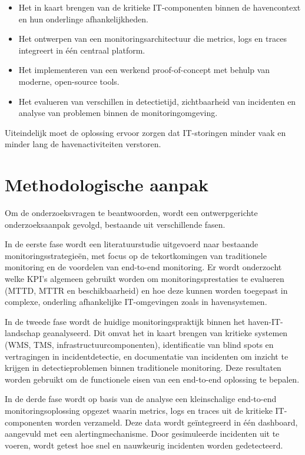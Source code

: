 \begin{itemize}
    \item Het in kaart brengen van de kritieke IT-componenten binnen de havencontext en hun onderlinge afhankelijkheden.
    \item Het ontwerpen van een monitoringsarchitectuur die metrics, logs en traces integreert in één centraal platform.
    \item Het implementeren van een werkend proof-of-concept met behulp van moderne, open-source tools.
    \item Het evalueren van verschillen in detectietijd, zichtbaarheid van incidenten en analyse van problemen binnen de monitoringomgeving.
\end{itemize}

Uiteindelijk moet de oplossing ervoor zorgen dat IT-storingen minder vaak en minder lang de havenactiviteiten verstoren.

\section{Methodologische aanpak}

Om de onderzoeksvragen te beantwoorden, wordt een ontwerpgerichte onderzoeksaanpak gevolgd, bestaande uit verschillende fasen.

In de eerste fase wordt een literatuurstudie uitgevoerd naar bestaande monitoringsstrategieën, met focus op de tekortkomingen van traditionele monitoring en de voordelen van end-to-end monitoring. Er wordt onderzocht welke KPI's algemeen gebruikt worden om monitoringsprestaties te evalueren (MTTD, MTTR en beschikbaarheid) en hoe deze kunnen worden toegepast in complexe, onderling afhankelijke IT-omgevingen zoals in havensystemen.

In de tweede fase wordt de huidige monitoringspraktijk binnen het haven-IT-landschap geanalyseerd. Dit omvat het in kaart brengen van kritieke systemen (WMS, TMS, infrastructuurcomponenten), identificatie van blind spots en vertragingen in incidentdetectie, en documentatie van incidenten om inzicht te krijgen in detectieproblemen binnen traditionele monitoring. Deze resultaten worden gebruikt om de functionele eisen van een end-to-end oplossing te bepalen.

In de derde fase wordt op basis van de analyse een kleinschalige end-to-end monitoringsoplossing opgezet waarin metrics, logs en traces uit de kritieke IT-componenten worden verzameld. Deze data wordt geïntegreerd in één dashboard, aangevuld met een alertingmechanisme. Door gesimuleerde incidenten uit te voeren, wordt getest hoe snel en nauwkeurig incidenten worden gedetecteerd.

